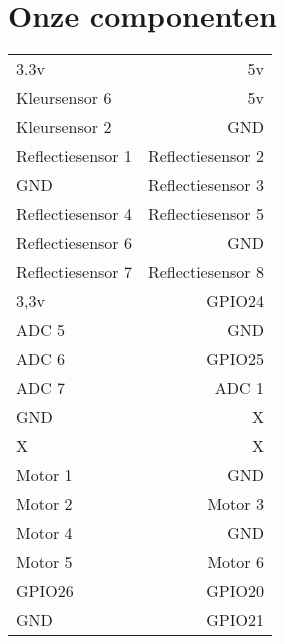 \documentclass[a4paper,kulak]{kulakarticle} %
\begin{document}
\section*{Onze componenten}
\begin{center}
	
	\begin{tabular}{l|r}
		3.3v              &                5v \\
		Kleursensor 6     &                5v \\
		Kleursensor 2     &               GND \\
		Reflectiesensor 1 & Reflectiesensor 2 \\
		GND               & Reflectiesensor 3 \\
		Reflectiesensor 4 & Reflectiesensor 5 \\
		Reflectiesensor 6 &               GND \\
		Reflectiesensor 7 & Reflectiesensor 8 \\
		3,3v              &            GPIO24 \\
		ADC 5             &               GND \\
		ADC 6             &            GPIO25 \\
		ADC 7             &             ADC 1 \\
		GND               &                 X \\
		X                 &                 X \\
		Motor 1           &               GND \\
		Motor 2           &           Motor 3 \\
		Motor 4           &               GND \\
		Motor 5           &           Motor 6 \\
		GPIO26            &            GPIO20 \\
		GND               &            GPIO21
	\end{tabular}
	
\end{center}
\end{document}
